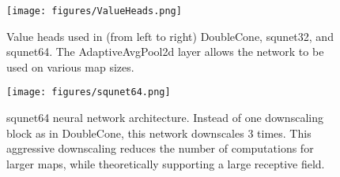 \documentclass[conference,onecolumn]{IEEEtran}
\newcounter{suppfigure}
\newenvironment{suppfigure}
  {\renewcommand{\figurename}{Supplemental Fig.}\setcounter{figure}{\value{suppfigure}}\addtocounter{suppfigure}{1}\begin{figure}}
  {\end{figure}\setcounter{suppfigure}{\value{figure}}}
\begin{document}
\begin{suppfigure}[H]
    \begin{center}
        \texttt{[image: figures/ValueHeads.png]}
    \end{center}
    \caption{Value heads used in (from left to right) DoubleCone, squnet32, and
    squnet64. The AdaptiveAvgPool2d layer allows the network to be used on various map
    sizes.}
    \label{fig:valueheads}
\end{suppfigure}

\begin{suppfigure}[H]
    \begin{center}
        \texttt{[image: figures/squnet64.png]}
    \end{center}
    \caption{squnet64 neural network architecture. Instead of one downscaling block as in DoubleCone, this network downscales 3 times. This aggressive downscaling reduces the number of computations for larger maps, while theoretically supporting a large receptive field.}
    \label{fig:squnet}
\end{suppfigure}
        
\end{document}
